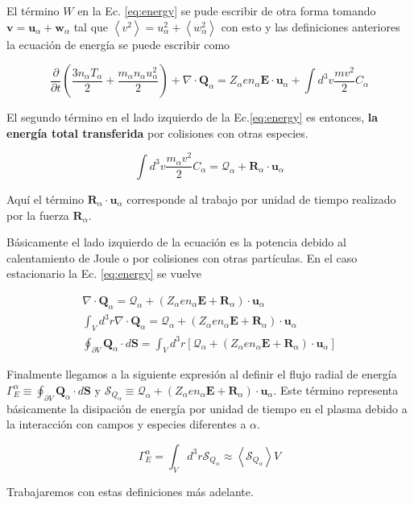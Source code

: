   El t\'ermino $W$ en la Ec. \eqref{eq:energy} se pude escribir de otra forma tomando $\textbf{v} = \textbf{u}_\alpha + \textbf{w}_\alpha$ tal que $\left<v^2\right> = u^2_\alpha + \left<w_\alpha^2\right>$ con esto y las definiciones anteriores la  ecuaci\'on de energ\'ia se puede escribir como \cite{helander2005} 

  \begin{equation}\label{eq:energy2}
    \frac{\partial}{\partial t}\left(\frac{3n_\alpha T_\alpha}{2} + \frac{m_\alpha n_\alpha u_\alpha^2}{2}\right) + \nabla\cdot\textbf{Q}_\alpha = Z_\alpha e n_\alpha \textbf{E}\cdot\textbf{u}_\alpha + \int d^3v\frac{mv^2}{2}C_\alpha
  \end{equation} 

  El segundo t\'ermino en el lado izquierdo de la Ec.\eqref{eq:energy} es entonces, \textbf{la energ\'ia total transferida} por colisiones con otras especies.

  \begin{equation}
     \int d^3v \frac{m_\alpha v^2}{2}C_\alpha = \mathcal{Q}_\alpha + \textbf{R}_\alpha\cdot\textbf{u}_\alpha
  \end{equation}

  Aqu\'i el t\'ermino $\textbf{R}_\alpha\cdot\textbf{u}_\alpha$ corresponde al trabajo por unidad de tiempo realizado por la fuerza $\textbf{R}_\alpha$.

  B\'asicamente el lado izquierdo de la ecuaci\'on es la potencia debido al calentamiento de Joule o por colisiones con otras part\'iculas. En el caso estacionario la Ec. \eqref{eq:energy} se vuelve

  \begin{eqnarray}
  \nabla\cdot\textbf{Q}_\alpha = \mathcal{Q}_\alpha + (Z_\alpha e n_\alpha\textbf{E} + \textbf{R}_\alpha)\cdot\textbf{u}_\alpha \nonumber\\
    \int_V d^3r \nabla\cdot\textbf{Q}_\alpha = \mathcal{Q}_\alpha + (Z_\alpha e n_\alpha\textbf{E} + \textbf{R}_\alpha)\cdot\textbf{u}_\alpha\nonumber\\
    \oint_{\partial V} \textbf{Q}_\alpha\cdot d\textbf{S} = \int_V d^3r\left[\mathcal{Q}_\alpha + (Z_\alpha e n_\alpha\textbf{E} + \textbf{R}_\alpha)\cdot\textbf{u}_\alpha\right] \nonumber
    \end{eqnarray}

    Finalmente llegamos a la siguiente expresi\'on al definir el flujo radial de energ\'ia $\Gamma_E^\alpha \equiv \oint_{\partial V} \textbf{Q}_\alpha\cdot d\textbf{S}$ y $\mathcal{S}_{Q_\alpha} \equiv \mathcal{Q}_{\alpha} + (Z_\alpha e n_\alpha\textbf{E} + \textbf{R}_\alpha)\cdot\textbf{u}_\alpha$. Este t\'ermino representa b\'asicamente la disipaci\'on de energ\'ia por unidad de tiempo en el plasma debido a la interacci\'on con campos y especies diferentes a $\alpha$.

    \begin{equation}
      \Gamma_E^\alpha = \int_Vd^3r \mathcal{S}_{Q_\alpha} \approx \left<\mathcal{S}_{Q_\alpha}\right>V
    \end{equation}

   Trabajaremos con estas definiciones m\'as adelante.

   

   

